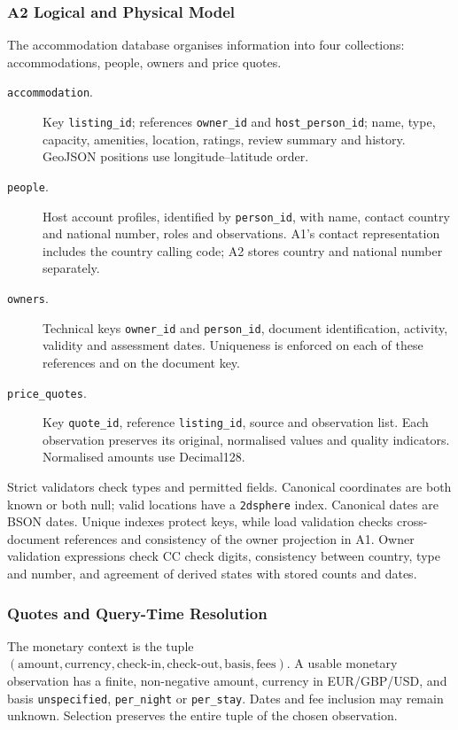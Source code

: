 \subsubsection{A2 Logical and Physical Model}
The accommodation database organises information into four collections: accommodations, people, owners and price quotes.
\begin{description}
\item[\texttt{accommodation}.] Key \texttt{listing\_\allowbreak{}id}; references \texttt{owner\_\allowbreak{}id} and \texttt{host\_\allowbreak{}person\_\allowbreak{}id}; name, type, capacity, amenities, location, ratings, review summary and history. GeoJSON positions use longitude--latitude order.
\item[\texttt{people}.] Host account profiles, identified by \texttt{person\_\allowbreak{}id}, with name, contact country and national number, roles and observations. A1's contact representation includes the country calling code; A2 stores country and national number separately.
\item[\texttt{owners}.] Technical keys \texttt{owner\_\allowbreak{}id} and \texttt{person\_\allowbreak{}id}, document identification, activity, validity and assessment dates. Uniqueness is enforced on each of these references and on the document key.
\item[\texttt{price\_\allowbreak{}quotes}.] Key \texttt{quote\_\allowbreak{}id}, reference \texttt{listing\_\allowbreak{}id}, source and observation list. Each observation preserves its original, normalised values and quality indicators. Normalised amounts use Decimal128.
\end{description}
Strict validators check types and permitted fields. Canonical coordinates are both known or both null; valid locations have a \texttt{2dsphere} index. Canonical dates are BSON dates. Unique indexes protect keys, while load validation checks cross-document references and consistency of the owner projection in A1. Owner validation expressions check CC check digits, consistency between country, type and number, and agreement of derived states with stored counts and dates.
\subsubsection{Quotes and Query-Time Resolution}
The monetary context is the tuple \( (\text{amount},\text{currency},\text{check-in},\text{check-out},\text{basis},\text{fees}) \). A usable monetary observation has a finite, non-negative amount, currency in EUR/GBP/USD, and basis \texttt{unspecified}, \texttt{per\_\allowbreak{}night} or \texttt{per\_\allowbreak{}stay}. Dates and fee inclusion may remain unknown. Selection preserves the entire tuple of the chosen observation.


